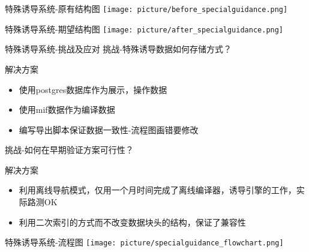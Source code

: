 \documentclass[10pt]{beamer}
\begin{document}
\begin{frame}{特殊诱导系统-原有结构图}
	\texttt{[image: picture/before\_specialguidance.png]}
\end{frame}

\begin{frame}{特殊诱导系统-期望结构图}
	\texttt{[image: picture/after\_specialguidance.png]}
\end{frame}

\begin{frame}{特殊诱导系统-挑战及应对}
	\alert{挑战-特殊诱导数据如何存储方式？}
	\begin{exampleblock}{解决方案}
		\begin{itemize}
			\item 使用postgres数据库作为展示，操作数据
			\item 使用mif数据作为编译数据
			\item 编写导出脚本保证数据一致性-流程图画错要修改
		\end{itemize}
	\end{exampleblock}
	\alert{挑战-如何在早期验证方案可行性？}
	\begin{exampleblock}{解决方案}
		\begin{itemize}
			\item 利用离线导航模式，仅用一个月时间完成了离线编译器，诱导引擎的工作，实际路测OK
			\item 利用二次索引的方式而不改变数据块头的结构，保证了兼容性
		\end{itemize}
	\end{exampleblock}
\end{frame}

\begin{frame}{特殊诱导系统-流程图}
	\texttt{[image: picture/specialguidance\_flowchart.png]}
\end{frame}
\end{document}
